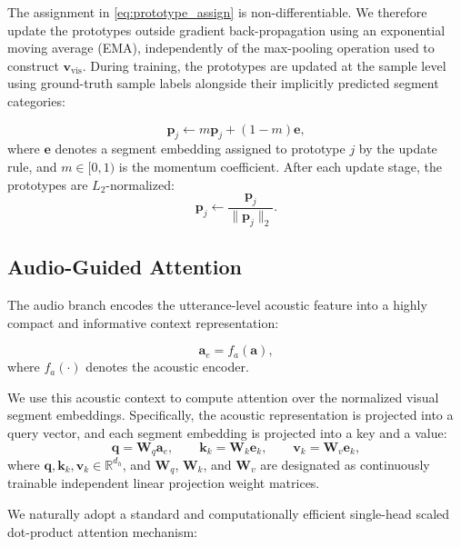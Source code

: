 \documentclass[sigconf,screen,review,anonymous]{acmart}
\begin{document}
The assignment in \eqref{eq:prototype_assign} is non-differentiable. We therefore update the prototypes outside gradient back-propagation using an exponential moving average (EMA), independently of the max-pooling operation used to construct $\mathbf{v}_{\mathrm{vis}}$. During training, the prototypes are updated at the sample level using ground-truth sample labels alongside their implicitly predicted segment categories:

\begin{equation}
\mathbf{p}_{j} \leftarrow m\mathbf{p}_{j} + (1-m)\mathbf{e},
\end{equation}
where $\mathbf{e}$ denotes a segment embedding assigned to prototype $j$ by the update rule, and $m \in [0,1)$ is the momentum coefficient. After each update stage, the prototypes are $L_2$-normalized:
\begin{equation}
\mathbf{p}_{j} \leftarrow \frac{\mathbf{p}_{j}}{\|\mathbf{p}_{j}\|_2}.
\end{equation}

\subsection{Audio-Guided Attention}

The audio branch encodes the utterance-level acoustic feature into a highly compact and informative context representation:

\begin{equation}
\mathbf{a}_e = f_a(\mathbf{a}),
\end{equation}
where $f_a(\cdot)$ denotes the acoustic encoder.

We use this acoustic context to compute attention over the normalized visual segment embeddings. Specifically, the acoustic representation is projected into a query vector, and each segment embedding is projected into a key and a value:
\begin{equation}
\mathbf{q} = \mathbf{W}_q \mathbf{a}_e,\qquad
\mathbf{k}_k = \mathbf{W}_k \mathbf{e}_k,\qquad
\mathbf{v}_k = \mathbf{W}_v \mathbf{e}_k,
\end{equation}
where $\mathbf{q}, \mathbf{k}_k, \mathbf{v}_k \in \mathbb{R}^{d_h}$, and $\mathbf{W}_q$, $\mathbf{W}_k$, and $\mathbf{W}_v$ are designated as continuously trainable independent linear projection weight matrices.



We naturally adopt a standard and computationally efficient single-head scaled dot-product attention mechanism:
\end{document}
